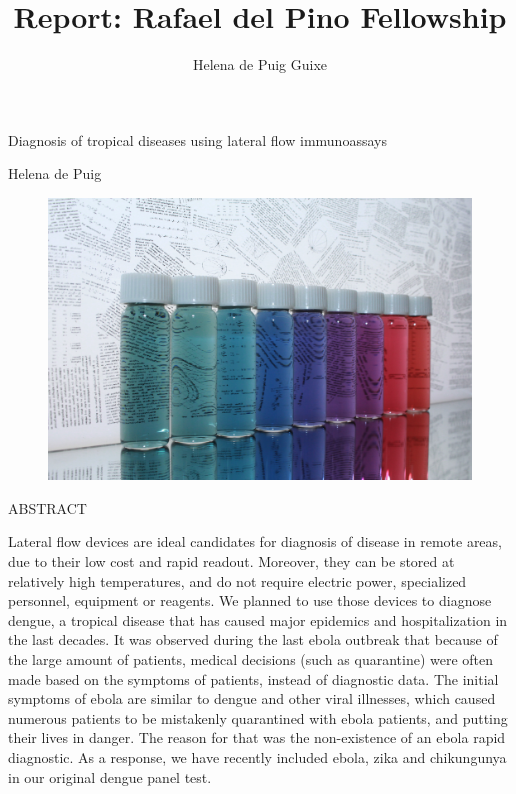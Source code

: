 \documentclass{article}
\title{Report: Rafael del Pino Fellowship}
\author{Helena de Puig Guixe}
\date{}
\begin{document}
\begingroup
\thispagestyle{empty}
\begin{center} 
\vspace*{2cm}
{\Huge Diagnosis of tropical diseases using lateral flow immunoassays}\par %
\vspace*{1cm}
{\Large Helena de Puig}\par %
\vspace{4cm}
\begin{figure}[!hb]
\centering
\includegraphics[width=150mm,scale=1.5]{Untitled.png}
\end{figure}
\clearpage
\end{center} 
{}
\thispagestyle{empty}
\vspace*{2cm}
\begin{center} 
{\Large ABSTRACT}\par
\end{center} 
\vspace*{1cm}
\noindent
Lateral flow devices are ideal candidates for diagnosis of disease in remote areas, due to their low cost and rapid readout. Moreover, they can be stored at relatively high temperatures, and do not require electric power, specialized personnel, equipment or reagents. We planned to use those devices to diagnose dengue, a tropical disease that has caused major epidemics and hospitalization in the last decades. It was observed during the last ebola outbreak that because of the large amount of patients, medical decisions (such as quarantine) were often made based on the symptoms of patients, instead of diagnostic data. The initial symptoms of ebola are similar to dengue and other viral illnesses, which caused numerous patients to be mistakenly quarantined with ebola patients, and putting their lives in danger. The reason for that was the non-existence of an ebola rapid diagnostic. As a response, we have recently included ebola, zika and chikungunya in our original dengue panel test.\\ 
\end{document}
